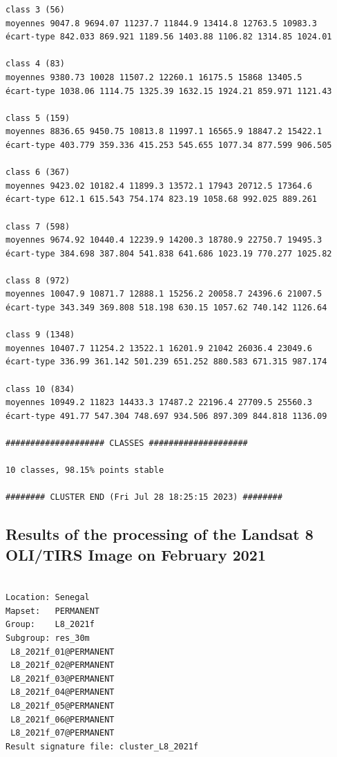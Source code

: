 \documentclass[earth,article,accept,pdftex,moreauthors]{Definitions/mdpi}
\begin{document}
{\begin{scriptsize}
\begin{verbatim}
class 3 (56)
moyennes 9047.8 9694.07 11237.7 11844.9 13414.8 12763.5 10983.3
écart-type 842.033 869.921 1189.56 1403.88 1106.82 1314.85 1024.01

class 4 (83)
moyennes 9380.73 10028 11507.2 12260.1 16175.5 15868 13405.5
écart-type 1038.06 1114.75 1325.39 1632.15 1924.21 859.971 1121.43

class 5 (159)
moyennes 8836.65 9450.75 10813.8 11997.1 16565.9 18847.2 15422.1
écart-type 403.779 359.336 415.253 545.655 1077.34 877.599 906.505

class 6 (367)
moyennes 9423.02 10182.4 11899.3 13572.1 17943 20712.5 17364.6
écart-type 612.1 615.543 754.174 823.19 1058.68 992.025 889.261

class 7 (598)
moyennes 9674.92 10440.4 12239.9 14200.3 18780.9 22750.7 19495.3
écart-type 384.698 387.804 541.838 641.686 1023.19 770.277 1025.82

class 8 (972)
moyennes 10047.9 10871.7 12888.1 15256.2 20058.7 24396.6 21007.5
écart-type 343.349 369.808 518.198 630.15 1057.62 740.142 1126.64

class 9 (1348)
moyennes 10407.7 11254.2 13522.1 16201.9 21042 26036.4 23049.6
écart-type 336.99 361.142 501.239 651.252 880.583 671.315 987.174

class 10 (834)
moyennes 10949.2 11823 14433.3 17487.2 22196.4 27709.5 25560.3
écart-type 491.77 547.304 748.697 934.506 897.309 844.818 1136.09

#################### CLASSES ####################

10 classes, 98.15% points stable

######## CLUSTER END (Fri Jul 28 18:25:15 2023) ########

\end{verbatim}
\end{scriptsize}

\subsection[\appendixname~\thesubsection]{Results of the processing of the Landsat 8 OLI/TIRS Image on February 2021}
\begin{scriptsize}
\begin{verbatim}

Location: Senegal
Mapset:   PERMANENT
Group:    L8_2021f
Subgroup: res_30m
 L8_2021f_01@PERMANENT
 L8_2021f_02@PERMANENT
 L8_2021f_03@PERMANENT
 L8_2021f_04@PERMANENT
 L8_2021f_05@PERMANENT
 L8_2021f_06@PERMANENT
 L8_2021f_07@PERMANENT
Result signature file: cluster_L8_2021f


\end{verbatim}
\end{scriptsize}}
\end{document}
